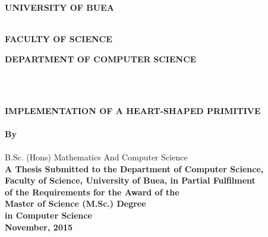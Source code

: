 \documentclass[11pt, oneside]{Thesis} %
\title{\ttitle} %
\begin{document}
\frontmatter %

\begin{titlepage}
\begin{center}
\textsc{\Large \textbf{UNIVERSITY OF BUEA}}\\[25pt]\\[3.0cm] %
\end{center}

\begin{minipage}{0.5\textwidth}
\begin{flushleft}
\large\textbf{FACULTY OF SCIENCE}
\end{flushleft}
\end{minipage}
\begin{minipage}{0.5\textwidth}
\begin{flushright}
\large\textbf{DEPARTMENT OF COMPUTER} \hspace*{290} \textbf{SCIENCE} 
\end{flushright}
\end{minipage}

\hspace{200}\\

\begin{center}
\\[1.5cm]
{\large \bfseries IMPLEMENTATION OF A HEART-SHAPED PRIMITIVE}\\[0.4cm] %
\\[2.5cm]

\large \textbf{ By } \\[0.75cm]

\Large \textbf{\authornames} \\ 

\small B.Sc. (Hons) Mathematics And Computer Science \\[2.5cm]

\large \textbf{A Thesis Submitted to the Department of Computer Science, \\
		Faculty of Science, University of Buea, in Partial Fulfilment \\ 
		of the Requirements for the Award of the \\
		Master of Science (M.Sc.) Degree \\
		in Computer Science}\\[2.5cm]

\large \textbf{November, 2015}

\end{center}

\end{titlepage}
\end{document}
